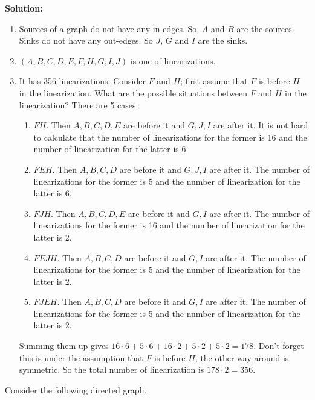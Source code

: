 \documentclass[11pt]{article}
\begin{document}
\begin{qunlist}
\textbf{Solution:} 
\begin{enumerate}
    \item Sources of a graph do not have any in-edges. So, $A$ and $B$ are the sources. Sinks do not have any out-edges. So $J$, $G$ and $I$ are the sinks.
    \item $(A, B, C, D, E, F, H, G, I, J)$ is one of linearizations. 
    \item It has 356 linearizations. Consider $F$ and $H$; first assume that $F$ is before $H$ in the linearization. What are the possible situations between $F$ and $H$ in the linearization? There are 5 cases:
        \begin{enumerate}
        \item $FH$. Then ${A,B,C,D,E}$ are before it and $G,J,I$ are after it. 
        It is not hard to calculate that the number of linearizations for the former is 16 and the number of linearization for the latter is 6.
        \item $FEH$. Then ${A,B,C,D}$ are before it and $G,J,I$ are after it. 
        The number of linearizations for the former is 5 and the number of linearization for the latter is 6.
        \item $FJH$. Then ${A,B,C,D,E}$ are before it and $G,I$ are after it. The number of linearizations for the former is 16 and the number of linearization for the latter is 2.
        \item $FEJH$. Then ${A,B,C,D}$ are before it and $G,I$ are after it. The number of linearizations for the former is 5 and the number of linearization for the latter is 2.
        \item $FJEH$. Then ${A,B,C,D}$ are before it and $G,I$ are after it. The number of linearizations for the former is 5 and the number of linearization for the latter is 2.
        \end{enumerate}
        Summing them up gives $16\cdot 6 + 5 \cdot 6 + 16 \cdot 2 + 5 \cdot 2 + 5 \cdot 2 = 178$. Don't forget this is under the assumption that $F$ is before $H$, the other way around is symmetric. So the total number of linearization is $178\cdot 2 = 356$.
    
\end{enumerate}


 Consider the following directed graph.
\\\\
\end{qunlist}
\end{document}
